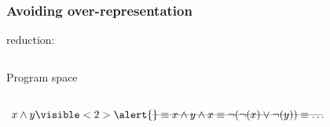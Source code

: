\documentclass{beamer}
\newcommand{\AND}{\land}
\newcommand{\OR}{\lor}
\newcommand{\NOT}{\lnot}
\begin{document}
\frame
{
  \frametitle{Avoiding over-representation}
  
   reduction:\\

  \begin{columns}
    \column{1in}
    
    
    \column{1.5in}
    Program space
  \end{columns}


  $x \AND y
  \visible<2>{\alert{\rlap{------------------------------------------------}}}
  \equiv x \AND y \AND x
  \equiv \NOT(\NOT(x) \OR \NOT(y))
  \equiv \ldots $\\
  
}
\end{document}
